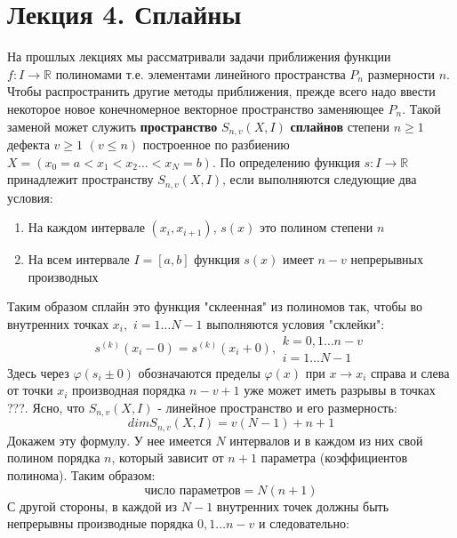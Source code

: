 \section*{Лекция 4. Сплайны}


На прошлых лекциях мы рассматривали задачи приближения функции \\
$f:I \rightarrow\mathbb{R}$ полиномами т.е. элементами линейного пространства $P_n$ размерности $n$. Чтобы распространить другие методы приближения, прежде всего надо ввести некоторое новое конечномерное векторное пространство заменяющее $P_n$. Такой заменой может служить \textbf{ пространство} $S_{n,v}(X,I)$ \textbf{сплайнов} степени $n\geq 1$ дефекта $v\geq 1$ $(v\leq n)$ построенное по разбиению $X = (x_0=a < x_1 < x_2\ldots < x_N=b)$. 
По определению функция $s:I\rightarrow \mathbb{R}$ принадлежит пространству $S_{n,v}(X,I)$, если выполняются следующие два условия:
\begin{enumerate}
	\item На каждом интервале $(x_i,x_{i+1})$, $s(x)$ это полином степени $n$
	\item На всем интервале $I=[a,b]$ функция $s(x)$ имеет $n-v$ непрерывных производных
\end{enumerate}
Таким образом сплайн это функция "склеенная" из полиномов так, чтобы во внутренних точках $x_i,$ $ i = 1\ldots N-1$ выполняются условия "склейки":
\begin{equation}
s^{\left( k\right) }\left( x_{i}-0\right) =s^{\left( k\right) }\left( x_{i}+0\right),
\begin{aligned}k=0,1\ldots n-v\\ i=1\ldots N-1\end{aligned}
\end{equation}
Здесь через $\varphi(s_i\pm 0)$ обозначаются пределы $\varphi(x)$ при $x \rightarrow x_i$ справа и слева от точки $x_i$ производная порядка $n-v+1$ уже может иметь разрывы в точках ???.
Ясно, что $S_{n,v}(X,I)$ - линейное пространство и его размерность:
\begin{equation}
dim S_{n,v}(X,I) = v(N-1) +n+1
\end{equation}
Докажем эту формулу. У нее имеется $N$ интервалов и в каждом из них свой полином порядка $n$, который зависит от $n+1$ параметра (коэффициентов полинома). Таким образом:
\begin{equation}
\textit{число параметров} = N(n+1)
\end{equation} 
С другой стороны, в каждой из $N-1$ внутренних точек должны быть непрерывны производные порядка $0,1\ldots n-v$ и следовательно:
